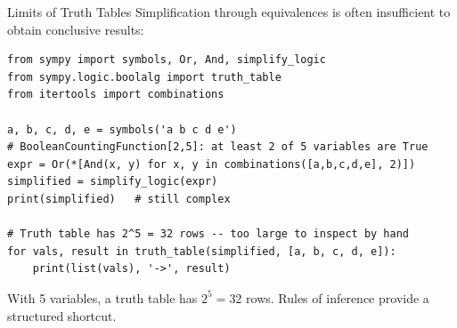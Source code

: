\documentclass[aspectratio=169]{beamer}
\begin{document}
\begin{frame}[fragile]{Limits of Truth Tables}
  Simplification through equivalences is often insufficient to obtain conclusive results:

  \begin{lstlisting}[style=python]
from sympy import symbols, Or, And, simplify_logic
from sympy.logic.boolalg import truth_table
from itertools import combinations

a, b, c, d, e = symbols('a b c d e')
# BooleanCountingFunction[2,5]: at least 2 of 5 variables are True
expr = Or(*[And(x, y) for x, y in combinations([a,b,c,d,e], 2)])
simplified = simplify_logic(expr)
print(simplified)   # still complex

# Truth table has 2^5 = 32 rows -- too large to inspect by hand
for vals, result in truth_table(simplified, [a, b, c, d, e]):
    print(list(vals), '->', result)
  \end{lstlisting}

  \medskip
  With 5 variables, a truth table has $2^5 = 32$ rows.
  Rules of inference provide a structured shortcut.
\end{frame}
\end{document}
